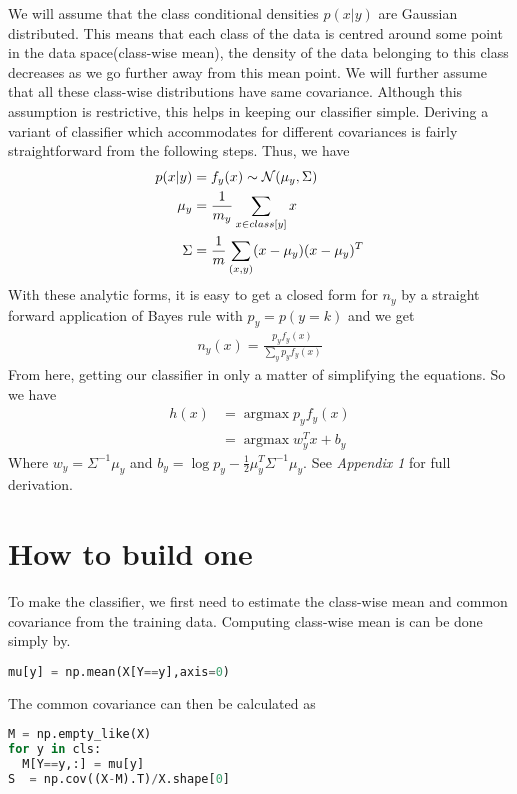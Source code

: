 \documentclass[12pt,crop=false,class=article,convert={density=300,outext=.compiled.png}]{standalone}
\begin{document}
We will assume that the class conditional densities $p(x|y)$ are
Gaussian distributed. This means that each class of the data is centred
around some point in the data space(class-wise mean), the density of the
data belonging to this class decreases as we go further away from this
mean point. We will further assume that all these class-wise
distributions have same covariance. Although this assumption is
restrictive, this helps in keeping our classifier simple. Deriving a
variant of classifier which accommodates for different covariances is
fairly straightforward from the following steps. Thus, we have
\begin{align*}
p(x|y) & = f_y(x) \sim \operatorname{\mathcal{N}}(\mu_y, \Sigma) 
\\
\mu_y &= \frac{1}{m_y} \sum_{x\in class[y]}x
\\
\Sigma &= \frac{1}{m} \sum_{(x,y)} (x-\mu_y)(x-\mu_y)^T
\end{align*}
%
With these analytic forms, it is easy to get a closed form for $n_y$ by
a straight forward application of Bayes rule with $p_y=p(y=k)$ and we
get
%
\begin{align*}
  n_y(x) = \frac{p_y f_y(x)}{\sum_yp_y f_y(x)}
\end{align*}
%
From here, getting our classifier in only a matter of simplifying the
equations. So we have
%
\begin{align*}
  h(x) &= \operatorname{arg max} p_yf_y(x)
  \\
  &= \operatorname{arg max} w_y^Tx + b_y
\end{align*}
%
Where $w_y = \Sigma^{-1}\mu_y$ and
$b_y = \log p_y - \frac{1}{2} \mu_y^{T}\Sigma^{-1}\mu_y$. See \textit{Appendix
1} for full derivation.

\section*{How to build one}
To make the classifier, we first need to estimate the class-wise mean
and common covariance from the training data. Computing class-wise mean
is can be done simply by.
\begin{lstlisting}[language=Python]
mu[y] = np.mean(X[Y==y],axis=0)
\end{lstlisting}

The common covariance can then be calculated as
\begin{lstlisting}[language=Python]
M = np.empty_like(X)
for y in cls:
  M[Y==y,:] = mu[y]
S  = np.cov((X-M).T)/X.shape[0]
\end{lstlisting}
\end{document}
